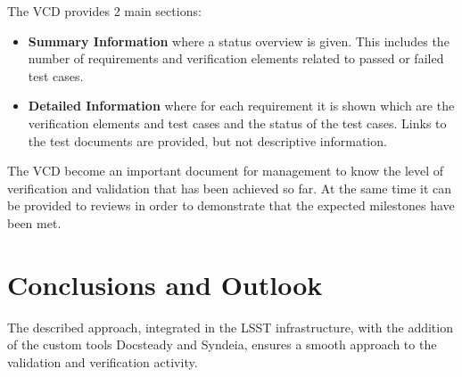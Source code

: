 The VCD provides 2 main sections:

\begin{itemize}
\item \textbf{Summary Information} where a status overview is given. 
This includes the number of requirements and verification elements related to passed or failed test cases.
\item \textbf{Detailed Information} where for each requirement it is shown which are the verification elements and test cases
and the status of the test cases. Links to the test documents are provided, but not descriptive information.
\end{itemize}

The VCD become an important document for management to know the level of verification and validation that has been achieved so far.
At the same time it can be provided to reviews in order to demonstrate that the expected milestones have been met.








\section{Conclusions and Outlook}

The described approach, integrated in the LSST infrastructure, with the addition of the custom tools Docsteady and Syndeia, 
ensures a smooth approach to the validation and verification activity. 

